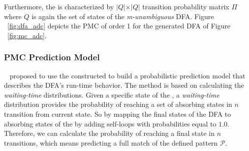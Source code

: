 \begin{itemize}[noitemsep]
\par Furthermore, the \pmcmr is characterized by $\vert Q \vert \times \vert Q \vert$ transition probability matrix $\Pi$ where $Q$ is again the set of states of the  \textit{m-unambiguous} DFA. Figure ~\ref{fig:dfa_adc} depicts the PMC of order 1 for the generated DFA of Figure ~\ref{fig:mc_adc}.

 
\end{itemize}




\subsubsection*{PMC Prediction Model}
\label{sec:pmc_prediction}

~\citet{alevizos2017event} proposed to use the constructed \pmcmr to build a probabilistic prediction model that describes the DFA's run-time behavior. The method is based on calculating the \textit{waiting-time} distributions. Given a specific state of the \pmcmr, a \textit{waiting-time} distribution provides the probability of reaching a set of absorbing states in $n$ transition from current state. So by mapping the final states of the DFA to absorbing states of the \pmcmr by adding self-loops with probabilities equal to $1.0$. Therefore, we can calculate the probability of reaching a final state in $n$ transitions,  which means predicting a full match of the defined pattern $\mathcal{P}$.

